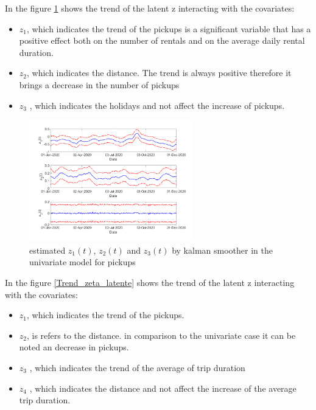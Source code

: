 In the figure \ref{Trend_zeta_latente univariato} shows the trend of the latent z interacting with the covariates:
\begin{itemize}
	\item $z_{1}$, which indicates the trend of the pickups is a significant variable that has a positive effect both on the number of rentals and on the average daily rental duration.
	\item $z_{2}$, which indicates the distance. The trend is always positive therefore it brings a decrease in the number of pickups
	\item $z_{3}$ , which indicates the holidays and not affect the increase of pickups.
\end{itemize}
\begin{figure}
	\centering
	\includegraphics[height=200px]{Images/pickupsfull.png}
	\caption[Estimated of latent z]{estimated $z_{1}(t)$,  $z_{2}(t)$ and $z_{3}(t)$ by kalman smoother in the univariate model for pickups}
	\label{Trend_zeta_latente univariato}
	
\end{figure}
In the figure \ref{Trend_zeta_latente} shows the trend of the latent z interacting with the covariates:
\begin{itemize}
	\item $z_{1}$, which indicates the trend of the pickups.
	\item $z_{2}$, is refers to the distance. in comparison to the univariate case it can be noted  an decrease in pickups.
	\item $z_{3}$ , which indicates the trend of the average of trip duration
	\item $z_{4}$ , which indicates the distance and not affect the increase of the average trip duration.
\end{itemize}
